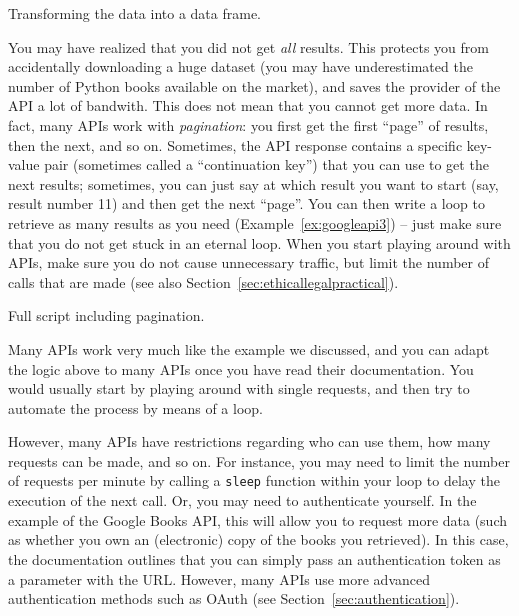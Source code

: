 \begin{ccsexample}
  \caption{Transforming the data into a data frame.}\label{ex:googleapi2}
\end{ccsexample}

You may have realized that you did not get \emph{all} results.
This protects you from accidentally downloading a huge dataset (you
may have underestimated the number of Python books available on the
market), and saves the provider of the API a lot of bandwith.
This does not mean that you cannot get more data. In fact, many APIs work
with \emph{pagination}: you first get the first ``page'' of results,
then the next, and so on. Sometimes, the API response contains
a specific key-value pair (sometimes called a ``continuation key'')
that you can use to get the next results; sometimes, you can just
say at which result you want to start (say, result number 11) and
then get the next ``page''. You can then write a loop to retrieve
as many results as you need (Example~\ref{ex:googleapi3}) -- just make sure
that you do not get stuck in an eternal loop. When you start playing
around with APIs, make sure you do not cause unnecessary traffic,
but limit the number of calls that are made (see also Section~\ref{sec:ethicallegalpractical}).


\begin{ccsexample}
  \caption{Full script including pagination.}\label{ex:googleapi3}
\end{ccsexample}



Many APIs work very much like the example we discussed, and you
can adapt the logic above to many APIs once you have read their
documentation. You would usually start by playing around with
single requests, and then try to automate the process by means
of a loop.

However, many APIs have restrictions regarding who can use them,
how many requests can be made, and so on.
For instance, you may need to limit the number of requests per minute
by calling a \texttt{sleep} function within your loop to delay the
execution of the next call. Or, you may need to authenticate
yourself. In the example of the Google Books API, this will
allow you to request more data (such as whether you own an
(electronic) copy of the books you retrieved). In this case,
the documentation outlines that you can simply pass an authentication
token as a parameter with the URL. However, many APIs use
more advanced authentication methods such as OAuth (see Section~\ref{sec:authentication}).

